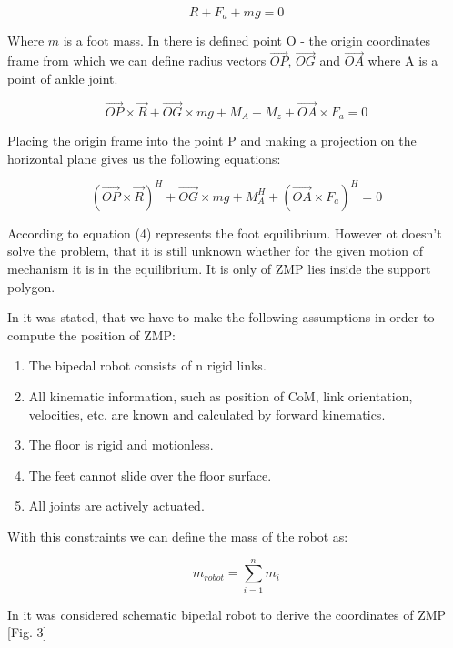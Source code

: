 \documentclass[11pt,a4paper]{article}
\begin{document}
	\begin{equation}
		R + F_a + mg = 0
	\end{equation}

Where $m$ is a foot mass. In \cite{vukobratovic2004zero} there is defined  point O - the origin coordinates frame from which we can define radius vectors $\vec{OP}$, $\vec{OG}$ and $\vec{OA}$ where A is a point of ankle joint.

	\begin{equation}
		\vec{OP} \times \vec{R} + \vec{OG} \times mg + M_A + M_z + \vec{OA} \times F_a = 0
	\end{equation}

Placing the origin frame into the point P and making a projection on the horizontal plane gives us the following equations: 

	\begin{equation}
		(\vec{OP} \times \vec{R})^H + \vec{OG} \times mg + M_A^H + (\vec{OA} \times F_a)^H = 0
	\end{equation}

According to \cite{vukobratovic2004zero} equation (4) represents the foot equilibrium. However ot doesn't solve the problem, that it is still unknown whether for the given motion of mechanism it is in the equilibrium. It is only of ZMP lies inside the support polygon.

In \cite{dekker2009zero} it was stated, that we have to make the following assumptions in order to compute the position of ZMP:

	\begin{enumerate}
		\item
			The bipedal robot consists of n rigid links.
		\item
			All kinematic information, such as position of CoM, link orientation, velocities, etc. are known and calculated by forward kinematics.
		\item
			The floor is rigid and motionless.
		\item
			The feet cannot slide over the floor surface.
		\item
			All joints are actively actuated.
	\end{enumerate}
	
With this constraints we can define the mass of the robot as:
	
	\begin{equation}
		m_{robot} = \sum^n_{i=1}{m_i}
	\end{equation}

In \cite{dekker2009zero} it was considered schematic bipedal robot to derive the coordinates of ZMP [Fig. 3]
\end{document}
